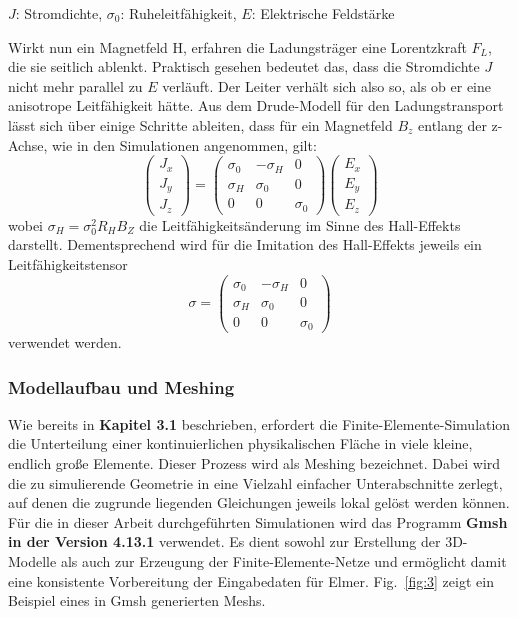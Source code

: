 \documentclass[12pt, a4paper]{article}
\renewcommand{\footnotesize}{\fontsize{10pt}{12pt}\selectfont}
\begin{document}
\vspace{-0.8em}
\begin{center}
	\footnotesize
	$J$: Stromdichte, $\sigma_0$: Ruheleitfähigkeit, $E$: Elektrische Feldstärke
\end{center}

Wirkt nun ein Magnetfeld H, erfahren die Ladungsträger eine Lorentzkraft $F_L$, die sie seitlich ablenkt. Praktisch gesehen bedeutet das, dass die Stromdichte $J$ nicht mehr parallel zu $E$ verläuft. Der Leiter verhält sich also so, als ob er eine anisotrope Leitfähigkeit hätte.\newline
Aus dem Drude-Modell für den Ladungstransport lässt sich über einige Schritte ableiten, dass für ein Magnetfeld $B_z$ entlang der z-Achse, wie in den Simulationen angenommen, gilt:
\begin{equation}
	\begin{pmatrix} J_x \\ J_y \\ J_z \end{pmatrix}=\begin{pmatrix} \sigma_0 & -\sigma_H & 0 \\ \sigma_H & \sigma_0 & 0 \\ 0 & 0 & \sigma_0\end{pmatrix} \begin{pmatrix} E_x \\ E_y \\ E_z \end{pmatrix}
	\tag{4.10}
	\label{4.10}
\end{equation}
wobei $\sigma_H=\sigma_0^2R_HB_Z$ die Leitfähigkeitsänderung im Sinne des Hall-Effekts darstellt.\newline%
Dementsprechend wird für die Imitation des Hall-Effekts jeweils ein Leitfähigkeitstensor 
\begin{equation}
	\sigma=\begin{pmatrix} \sigma_0 & -\sigma_H & 0 \\ \sigma_H & \sigma_0 & 0 \\ 0 & 0 & \sigma_0\end{pmatrix}
	\tag{4.11}
	\label{4.11}
\end{equation}
verwendet werden.

\subsubsection{Modellaufbau und Meshing}
Wie bereits in \textbf{Kapitel 3.1} beschrieben, erfordert die Finite-Elemente-Simulation die Unterteilung einer kontinuierlichen physikalischen Fläche in viele kleine, endlich große Elemente. Dieser Prozess wird als Meshing bezeichnet. Dabei wird die zu simulierende Geometrie in eine Vielzahl einfacher Unterabschnitte zerlegt, auf denen die zugrunde liegenden Gleichungen jeweils lokal gelöst werden können.\newline
Für die in dieser Arbeit durchgeführten Simulationen wird das Programm \textbf{Gmsh in der Version 4.13.1} verwendet. Es dient sowohl zur Erstellung der 3D-Modelle als auch zur Erzeugung der Finite-Elemente-Netze und ermöglicht damit eine konsistente Vorbereitung der Eingabedaten für Elmer. Fig.~\ref{fig:3} zeigt ein Beispiel eines in Gmsh generierten Meshs.
\end{document}

